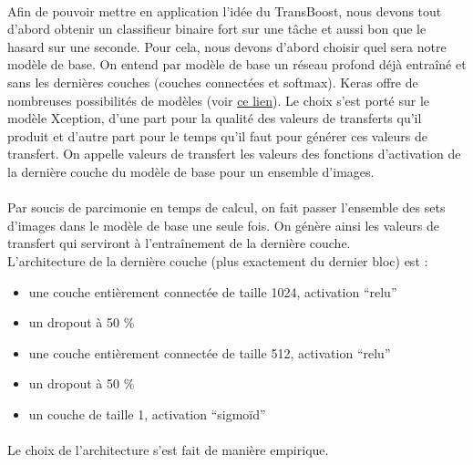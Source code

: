\documentclass[11 pt]{article}
\begin{document}
\paragraph{}Afin de pouvoir mettre en application l’idée du TransBoost, nous devons tout d’abord obtenir un classifieur binaire fort sur une tâche et aussi bon que le hasard sur une seconde. Pour cela, nous devons d’abord choisir quel sera notre modèle de base. On entend par modèle de base un réseau profond déjà entraîné et sans les dernières couches (couches connectées et softmax). Keras offre de nombreuses possibilités de modèles (voir \href{https://keras.io/applications/}{ce lien}). Le choix s’est porté sur le modèle Xception, d’une part pour la qualité des valeurs de transferts qu’il produit et d’autre part pour le temps qu’il faut pour générer ces valeurs de transfert. On appelle valeurs de transfert les valeurs des fonctions d’activation de la dernière couche du modèle de base pour un ensemble d’images.

\paragraph{}Par soucis de parcimonie en temps de calcul, on fait passer l’ensemble des sets d’images dans le modèle de base une seule fois. On génère ainsi les valeurs de transfert qui serviront à l’entraînement de la dernière couche. \\
L’architecture de la dernière couche (plus exactement du dernier bloc) est :\\ \medskip
\begin{samepage}
  \begin{itemize}
    \item une couche entièrement connectée de taille 1024, activation “relu”
    \nopagebreak
    \item un dropout à 50 \%
    \nopagebreak
    \item une couche entièrement connectée de taille 512, activation “relu”
    \nopagebreak
    \item un dropout à 50 \%
    \nopagebreak
    \item un couche de taille 1, activation “sigmoïd”
  \end{itemize}
\end{samepage}

\medskip 

\paragraph{}Le choix de l'architecture s’est fait de manière empirique.\\
\end{document}
